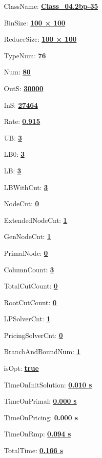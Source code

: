 \documentclass[11pt]{article}
\begin{document}
\pagestyle{empty}


ClassName: \underline{\textbf{Class_04.2bp-35}}
\par
BinSize: \underline{\textbf{100 × 100}}
\par
ReduceSize: \underline{\textbf{100 × 100}}
\par
TypeNum: \underline{\textbf{76}}
\par
Num: \underline{\textbf{80}}
\par
OutS: \underline{\textbf{30000}}
\par
InS: \underline{\textbf{27464}}
\par
Rate: \underline{\textbf{0.915}}
\par
UB: \underline{\textbf{3}}
\par
LB0: \underline{\textbf{3}}
\par
LB: \underline{\textbf{3}}
\par
LBWithCut: \underline{\textbf{3}}
\par
NodeCut: \underline{\textbf{0}}
\par
ExtendedNodeCnt: \underline{\textbf{1}}
\par
GenNodeCnt: \underline{\textbf{1}}
\par
PrimalNode: \underline{\textbf{0}}
\par
ColumnCount: \underline{\textbf{3}}
\par
TotalCutCount: \underline{\textbf{0}}
\par
RootCutCount: \underline{\textbf{0}}
\par
LPSolverCnt: \underline{\textbf{1}}
\par
PricingSolverCnt: \underline{\textbf{0}}
\par
BranchAndBoundNum: \underline{\textbf{1}}
\par
isOpt: \underline{\textbf{true}}
\par
TimeOnInitSolution: \underline{\textbf{0.010 s}}
\par
TimeOnPrimal: \underline{\textbf{0.000 s}}
\par
TimeOnPricing: \underline{\textbf{0.000 s}}
\par
TimeOnRmp: \underline{\textbf{0.094 s}}
\par
TotalTime: \underline{\textbf{0.166 s}}
\par
\newpage
\end{document}
